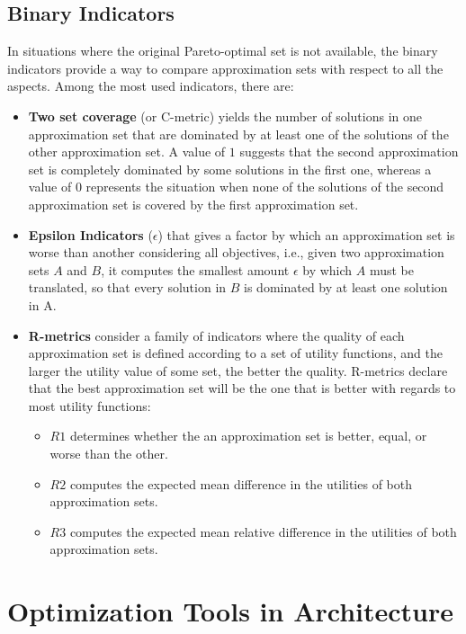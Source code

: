 \subsection{Binary Indicators}

In situations where the original Pareto-optimal set is not available, the binary indicators provide a way to compare approximation sets with respect to all the aspects. Among the most used indicators, there are:
\begin{itemize}
\item \textbf{Two set coverage} (or C-metric) yields the number of solutions in one approximation set that are dominated by at least one of the solutions of the other approximation set. A value of $1$ suggests that the second approximation set is completely dominated by some solutions in the first one, whereas a value of $0$ represents the situation when none of the solutions of the second approximation set is covered by the first approximation set.
\item \textbf{Epsilon Indicators} ($\epsilon$) that gives a factor by which an approximation set is worse than another considering all objectives, i.e., given two approximation sets $A$ and $B$, it computes the smallest amount $\epsilon$ by which $A$ must be translated, so that every solution in $B$ is dominated by at least one solution in A. 
\item \textbf{R-metrics} consider a family of indicators where the quality of each approximation set is defined according to a set of utility functions, and the larger the utility value of some set, the better the quality. R-metrics declare that the best approximation set will be the one that is better with regards to most utility functions:
	\begin{itemize}
	\item \textbf{$R1$} determines whether the an approximation set is better, equal, or worse than the other. 
	\item \textbf{$R2$} computes the expected mean difference in the utilities of both approximation sets.
	\item \textbf{$R3$} computes the expected mean relative difference in the utilities of both approximation sets.
	\end{itemize}
\end{itemize}

\section{Optimization Tools in Architecture}
	
